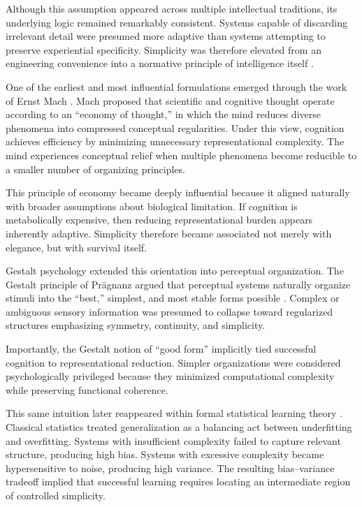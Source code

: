 \documentclass[12pt,a4paper]{article}
\begin{document}
Although this assumption appeared across multiple intellectual traditions, its underlying logic remained remarkably consistent. Systems capable of discarding irrelevant detail were presumed more adaptive than systems attempting to preserve experiential specificity. Simplicity was therefore elevated from an engineering convenience into a normative principle of intelligence itself \cite{Chater1999}.

One of the earliest and most influential formulations emerged through the work of Ernst Mach \cite{Mach1905}. Mach proposed that scientific and cognitive thought operate according to an ``economy of thought,'' in which the mind reduces diverse phenomena into compressed conceptual regularities. Under this view, cognition achieves efficiency by minimizing unnecessary representational complexity. The mind experiences conceptual relief when multiple phenomena become reducible to a smaller number of organizing principles.

This principle of economy became deeply influential because it aligned naturally with broader assumptions about biological limitation. If cognition is metabolically expensive, then reducing representational burden appears inherently adaptive. Simplicity therefore became associated not merely with elegance, but with survival itself.

Gestalt psychology extended this orientation into perceptual organization. The Gestalt principle of Pr\"{a}gnanz argued that perceptual systems naturally organize stimuli into the ``best,'' simplest, and most stable forms possible \cite{Koffka1935}. Complex or ambiguous sensory information was presumed to collapse toward regularized structures emphasizing symmetry, continuity, and simplicity.

Importantly, the Gestalt notion of ``good form'' implicitly tied successful cognition to representational reduction. Simpler organizations were considered psychologically privileged because they minimized computational complexity while preserving functional coherence.

This same intuition later reappeared within formal statistical learning theory \cite{Vapnik1998,Valiant1984}. Classical statistics treated generalization as a balancing act between underfitting and overfitting. Systems with insufficient complexity failed to capture relevant structure, producing high bias. Systems with excessive complexity became hypersensitive to noise, producing high variance. The resulting bias--variance tradeoff implied that successful learning requires locating an intermediate region of controlled simplicity.
\end{document}

